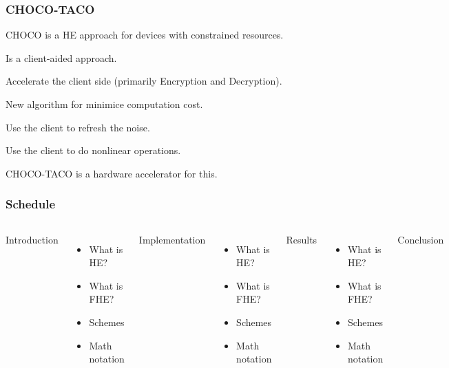 \documentclass[10pt,handout]{beamer}
\begin{document}
\begin{frame}
    \frametitle{CHOCO-TACO}

    CHOCO is a HE approach for devices with constrained resources.

    Is a client-aided approach.

    Accelerate the client side (primarily Encryption and Decryption).

    New algorithm for minimice computation cost.

    Use the client to refresh the noise.

    Use the client to do nonlinear operations.

    CHOCO-TACO is a hardware accelerator for this.
\end{frame}
\begin{frame}[noframenumbering]
    \frametitle{Schedule}
\begin{columns}
    Introduction
    \begin{itemize}
        \item What is HE?
        \item What is FHE?
        \item Schemes
        \item Math notation
    \end{itemize}

    Implementation
    \begin{itemize}
        \item What is HE?
        \item What is FHE?
        \item Schemes
        \item Math notation
    \end{itemize}

    Results
    \begin{itemize}
        \item What is HE?
        \item What is FHE?
        \item Schemes
        \item Math notation
    \end{itemize}
    Conclusion
\end{columns}

\end{frame}
\end{document}
